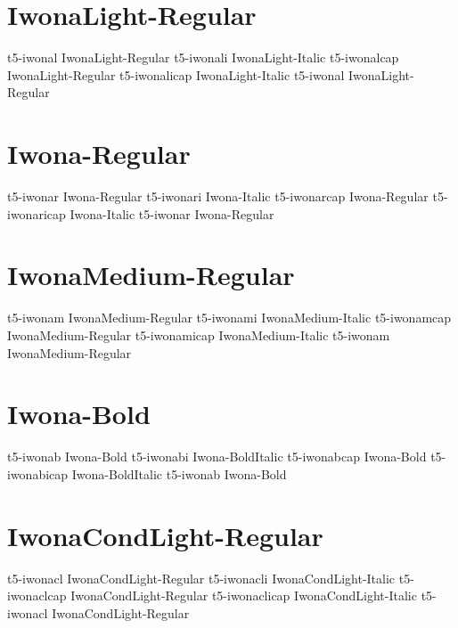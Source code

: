 \documentclass[sample]{vnsample}
\begin{document}
\section{IwonaLight-Regular}
      {t5-iwonal}      {IwonaLight-Regular}
     {t5-iwonali}     {IwonaLight-Italic}
     {t5-iwonalcap}   {IwonaLight-Regular}
   {t5-iwonalicap}  {IwonaLight-Italic}
      {t5-iwonal}      {IwonaLight-Regular}

\section{Iwona-Regular}
      {t5-iwonar}      {Iwona-Regular}
     {t5-iwonari}     {Iwona-Italic}
     {t5-iwonarcap}   {Iwona-Regular}
   {t5-iwonaricap}  {Iwona-Italic}
      {t5-iwonar}      {Iwona-Regular}

\section{IwonaMedium-Regular}
     {t5-iwonam}      {IwonaMedium-Regular}
    {t5-iwonami}     {IwonaMedium-Italic}
    {t5-iwonamcap}   {IwonaMedium-Regular}
  {t5-iwonamicap}  {IwonaMedium-Italic}
     {t5-iwonam}      {IwonaMedium-Regular}

\section{Iwona-Bold}
      {t5-iwonab}      {Iwona-Bold}
     {t5-iwonabi}     {Iwona-BoldItalic}
     {t5-iwonabcap}   {Iwona-Bold}
   {t5-iwonabicap}  {Iwona-BoldItalic}
      {t5-iwonab}      {Iwona-Bold}

\section{IwonaCondLight-Regular}
     {t5-iwonacl}     {IwonaCondLight-Regular}
    {t5-iwonacli}    {IwonaCondLight-Italic}
    {t5-iwonaclcap}  {IwonaCondLight-Regular}
  {t5-iwonaclicap} {IwonaCondLight-Italic}
     {t5-iwonacl}     {IwonaCondLight-Regular}
\end{document}
